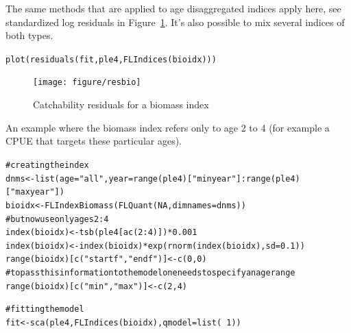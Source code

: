 \documentclass[a4paper,english,10pt]{article}\usepackage[]{graphicx}\usepackage[]{color}
\makeatletter
\newcommand{\hlnum}[1]{\textcolor[rgb]{0.2,0.2,0.2}{#1}}%
\newcommand{\hlstr}[1]{\textcolor[rgb]{0.2,0.2,0.2}{#1}}%
\newcommand{\hlcom}[1]{\textcolor[rgb]{0.2,0.267,0.4}{#1}}%
\newcommand{\hlopt}[1]{\textcolor[rgb]{0.2,0.2,0.2}{#1}}%
\newcommand{\hlstd}[1]{\textcolor[rgb]{0,0,0}{#1}}%
\newcommand{\hlkwb}[1]{\textcolor[rgb]{0.361,0.506,0.596}{#1}}%
\newcommand{\hlkwc}[1]{\textcolor[rgb]{0.361,0.506,0.596}{#1}}%
\newcommand{\hlkwd}[1]{\textcolor[rgb]{0.361,0.506,0.596}{#1}}%
\newenvironment{kframe}{%
 \def\at@end@of@kframe{}%
 \ifinner\ifhmode%
  \def\at@end@of@kframe{\end{minipage}}%
  \begin{minipage}{\columnwidth}%
 \fi\fi%
 \def\FrameCommand##1{\hskip\@totalleftmargin \hskip-\fboxsep
 \colorbox{shadecolor}{##1}\hskip-\fboxsep
     \hskip-\linewidth \hskip-\@totalleftmargin \hskip\columnwidth}%
 \MakeFramed {\advance\hsize-\width
   \@totalleftmargin\z@ \linewidth\hsize
   \@setminipage}}%
 {\par\unskip\endMakeFramed%
 \at@end@of@kframe}
\newenvironment{knitrout}{}{} %
\makeatother
\begin{document}
The same methods that are applied to age disaggregated indices apply here, see standardized log residuals in Figure~\ref{fig:resbio}. It's also possible to mix several indices of both types.

\begin{knitrout}
\color{fgcolor}\begin{kframe}
\begin{alltt}
\hlkwd{plot}\hlstd{(}\hlkwd{residuals}\hlstd{(fit, ple4,} \hlkwd{FLIndices}\hlstd{(bioidx)))}
\end{alltt}
\end{kframe}\begin{figure}[H]


{\centering \texttt{[image: figure/resbio]} 

}

\caption[Catchability residuals for a biomass index]{Catchability residuals for a biomass index\label{fig:resbio}}
\end{figure}


\end{knitrout}

An example where the biomass index refers only to age 2 to 4 (for example a CPUE that targets these particular ages).

\begin{knitrout}
\color{fgcolor}\begin{kframe}
\begin{alltt}
\hlcom{# creating the index}
\hlstd{dnms} \hlkwb{<-} \hlkwd{list}\hlstd{(}\hlkwc{age}\hlstd{=}\hlstr{"all"}\hlstd{,} \hlkwc{year}\hlstd{=}\hlkwd{range}\hlstd{(ple4)[}\hlstr{"minyear"}\hlstd{]}\hlopt{:}\hlkwd{range}\hlstd{(ple4)[}\hlstr{"maxyear"}\hlstd{])}
\hlstd{bioidx} \hlkwb{<-} \hlkwd{FLIndexBiomass}\hlstd{(}\hlkwd{FLQuant}\hlstd{(}\hlnum{NA}\hlstd{,} \hlkwc{dimnames}\hlstd{=dnms))}
\hlcom{# but now use only ages 2:4}
\hlkwd{index}\hlstd{(bioidx)} \hlkwb{<-} \hlkwd{tsb}\hlstd{(ple4[}\hlkwd{ac}\hlstd{(}\hlnum{2}\hlopt{:}\hlnum{4}\hlstd{)])}\hlopt{*}\hlnum{0.001}
\hlkwd{index}\hlstd{(bioidx)} \hlkwb{<-} \hlkwd{index}\hlstd{(bioidx)}\hlopt{*}\hlkwd{exp}\hlstd{(}\hlkwd{rnorm}\hlstd{(}\hlkwd{index}\hlstd{(bioidx),} \hlkwc{sd}\hlstd{=}\hlnum{0.1}\hlstd{))}
\hlkwd{range}\hlstd{(bioidx)[}\hlkwd{c}\hlstd{(}\hlstr{"startf"}\hlstd{,}\hlstr{"endf"}\hlstd{)]} \hlkwb{<-} \hlkwd{c}\hlstd{(}\hlnum{0}\hlstd{,}\hlnum{0}\hlstd{)}
\hlcom{# to pass this information to the model one needs to specify an age range}
\hlkwd{range}\hlstd{(bioidx)[}\hlkwd{c}\hlstd{(}\hlstr{"min"}\hlstd{,}\hlstr{"max"}\hlstd{)]} \hlkwb{<-} \hlkwd{c}\hlstd{(}\hlnum{2}\hlstd{,}\hlnum{4}\hlstd{)}

\hlcom{# fitting the model}
\hlstd{fit} \hlkwb{<-} \hlkwd{sca}\hlstd{(ple4,} \hlkwd{FLIndices}\hlstd{(bioidx),} \hlkwc{qmodel}\hlstd{=}\hlkwd{list}\hlstd{(}\hlopt{~}\hlnum{1}\hlstd{))}
\end{alltt}
\end{kframe}
\end{knitrout}
\end{document}
